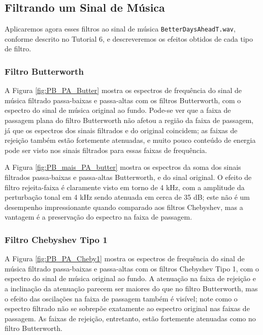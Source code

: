 \documentclass[a4paper,twoside,12pt]{article}
\begin{document}
	\clearpage
	\newpage
	
	\subsection{Filtrando um Sinal de Música}
	
	Aplicaremos agora esses filtros ao sinal de música {\tt BetterDaysAheadT.wav}, conforme descrito no Tutorial 6, e descreveremos os efeitos obtidos de cada tipo de filtro.
	
	\subsubsection{Filtro Butterworth}
	A Figura \ref{fig:PB_PA_Butter} mostra os espectros de frequência do sinal de música filtrado passa-baixas e passa-altas com os filtros Butterworth, com o espectro do sinal de música original ao fundo. Pode-se ver que a faixa de passagem plana do filtro Butterworth não afetou a região da faixa de passagem, já que os espectros dos sinais filtrados e do original coincidem; as faixas de rejeição também estão fortemente atenuadas, e muito pouco conteúdo de energia pode ser visto nos sinais filtrados para essas faixas de frequência.
	
	A Figura \ref{fig:PB_mais_PA_butter} mostra os espectros da soma dos sinais filtrados passa-baixas e passa-altas Butterworth, e do sinal original. O efeito de filtro rejeita-faixa é claramente visto em torno de 4 kHz, com a amplitude da perturbação tonal em 4 kHz sendo atenuada em cerca de 35 dB; este não é um desempenho impressionante quando comparado aos filtros Chebyshev, mas a vantagem é a preservação do espectro na faixa de passagem.
	
	\subsubsection{Filtro Chebyshev Tipo 1}
	
	A Figura \ref{fig:PB_PA_Cheby1} mostra os espectros de frequência do sinal de música filtrado passa-baixas e passa-altas com os filtros Chebyshev Tipo 1, com o espectro do sinal de música original ao fundo. A atenuação na faixa de rejeição e a inclinação da atenuação parecem ser maiores do que no filtro Butterworth, mas o efeito das oscilações na faixa de passagem também é visível; note como o espectro filtrado não se sobrepõe exatamente ao espectro original nas faixas de passagem. As faixas de rejeição, entretanto, estão fortemente atenuadas como no filtro Butterworth.
	
\end{document}

